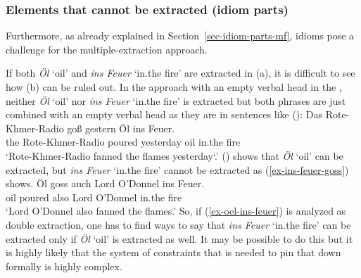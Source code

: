\subsubsection{Elements that cannot be extracted (idiom parts)}

Furthermore, as already explained in Section~\ref{sec-idiom-parts-mf}, idioms pose a challenge for the
multiple-extraction approach.

\eal
{}
\zl 

\noindent
If both \emph{Öl} `oil' and \emph{ins Feuer} `in.the fire' are extracted in (a), it is difficult to see how
(b) can be ruled out. In the approach with an empty verbal head in the \vf, neither \emph{Öl} `oil'
nor \emph{ins Feuer} `in.the fire' is extracted but both phrases are just combined with an empty verbal head as
they are in sentences like ():
\ea
\gll Das Rote-Khmer-Radio goß gestern Öl ins Feuer.\\
     the Rote-Khmer-Radio poured yesterday oil in.the fire\\
\glt `Rote-Khmer-Radio fanned the flames yesterday`.'
\z
() shows that \emph{Öl} `oil' can be extracted, but \emph{ins Feuer} `in.the fire' cannot be extracted as
(\ref{ex-ins-feuer-goss}) shows.
\ea
\gll Öl goss auch Lord O’Donnel ins Feuer.\footnotemark\\
     oil poured also Lord O'Donnel in.the fire\\
\glt `Lord O'Donnel also fanned the flames.'
\z
So, if (\ref{ex-oel-ins-feuer}) is analyzed as double extraction, one has to find ways to say that
\emph{ins Feuer} `in.the fire' can be extracted only if \emph{Öl} `oil' is extracted as well. It may be possible to do
this but it is highly likely that the system of constraints that is needed to pin that down formally
is highly complex.

